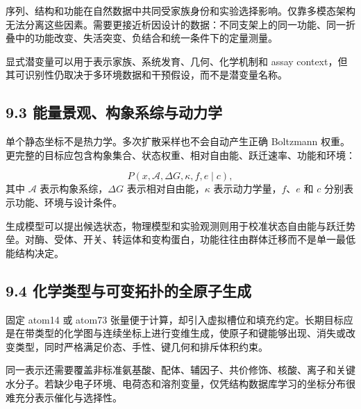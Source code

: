 \documentclass[10pt]{article}
\begin{document}

序列、结构和功能在自然数据中共同受家族身份和实验选择影响。仅靠多模态架构无法分离这些因素。需要更接近析因设计的数据：不同支架上的同一功能、同一折叠中的功能改变、失活突变、负结合和统一条件下的定量测量。\par

显式潜变量可以用于表示家族、系统发育、几何、化学机制和 assay context，但其可识别性仍取决于多环境数据和干预假设，而不是潜变量名称。\par

\subsection*{9.3 能量景观、构象系综与动力学}


单个静态坐标不是热力学。多次扩散采样也不会自动产生正确 Boltzmann 权重。更完整的目标应包含构象集合、状态权重、相对自由能、跃迁速率、功能和环境：\par


\begin{equation}
P\!\left(
x,\mathcal A,\Delta G,\kappa,f,e\mid c
\right),
\end{equation}
其中 $\mathcal A$ 表示构象系综，$\Delta G$ 表示相对自由能，$\kappa$ 表示动力学量，$f$、$e$ 和 $c$ 分别表示功能、环境与设计条件。

生成模型可以提出候选状态，物理模型和实验观测则用于校准状态自由能与跃迁势垒。对酶、受体、开关、转运体和变构蛋白，功能往往由群体迁移而不是单一最低能结构决定。\par

\subsection*{9.4 化学类型与可变拓扑的全原子生成}


固定 atom14 或 atom73 张量便于计算，却引入虚拟槽位和填充约定。长期目标应是在带类型的化学图与连续坐标上进行变维生成，使原子和键能够出现、消失或改变类型，同时严格满足价态、手性、键几何和排斥体积约束。\par

同一表示还需要覆盖非标准氨基酸、配体、辅因子、共价修饰、核酸、离子和关键水分子。若缺少电子环境、电荷态和溶剂变量，仅凭结构数据库学习的坐标分布很难充分表示催化与选择性。\par
\end{document}
